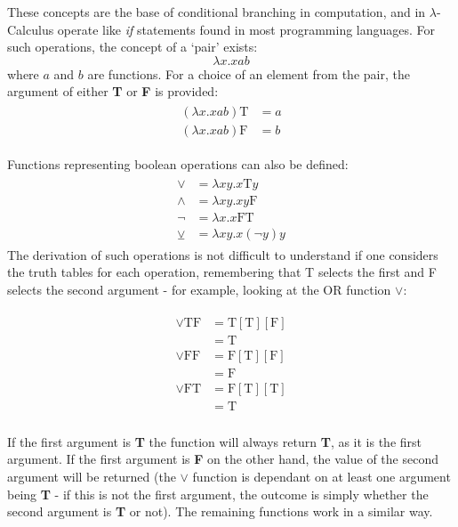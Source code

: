\documentclass[Master.tex]{subfiles}
\begin{document}
These concepts are the base of conditional branching in computation, and in $\lambda$-Calculus operate like \textit{if} statements found in most programming languages. For such operations, the concept of a `pair' exists:
\cite{church1941lambda}
\begin{equation*}
\lambda x.xab
\end{equation*}
where $a$ and $b$ are functions. For a choice of an element from the pair, the argument of either \textbf{T} or \textbf{F} is provided:
\begin{gather*}
\begin{aligned}
(\lambda x.xab)\bm{\mathrm{T}} &= a\\
(\lambda x.xab)\bm{\mathrm{F}} &= b
\end{aligned}
\end{gather*}

Functions representing boolean operations can also be defined:
\cite{rojas2015lambdatutorial}
\begin{gather*}
\begin{aligned}
\vee &= \lambda xy.x\bm{\mathrm{T}}y\\
\wedge &= \lambda xy.xy\bm{\mathrm{F}}\\
\lnot &= \lambda x.x\bm{\mathrm{FT}} \\
\veebar &= \lambda xy.x(\lnot y)y
\end{aligned}
\end{gather*}
The derivation of such operations is not difficult to understand if one considers the truth tables for each operation, remembering that T selects the first and F selects the second argument - for example, looking at the OR function $\vee$:

\begin{gather*}
\begin{aligned}
\vee \bm{\mathrm{TF}} &= \bm{\mathrm{T}}[\bm{\mathrm{T}}][\bm{\mathrm{F}}] \\
&= \bm{\mathrm{T}} \\
\vee \bm{\mathrm{FF}} &= \bm{\mathrm{F}}[\bm{\mathrm{T}}][\bm{\mathrm{F}}] \\
&= \bm{\mathrm{F}} \\
\vee \bm{\mathrm{FT}} &= \bm{\mathrm{F}}[\bm{\mathrm{T}}][\bm{\mathrm{T}}] \\
&= \bm{\mathrm{T}} \\
\end{aligned}
\end{gather*}

If the first argument is \textbf{T} the function will always return \textbf{T}, as it is the first argument. If the first argument is \textbf{F} on the other hand, the value of the second argument will be returned (the $\vee$ function is dependant on at least one argument being \textbf{T} - if this is not the first argument, the outcome is simply whether the second argument is \textbf{T} or not). The remaining functions work in a similar way.
\end{document}
